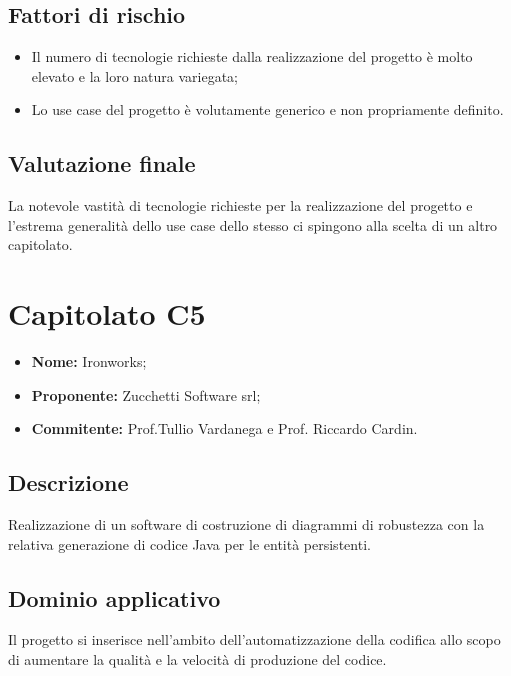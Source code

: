 \documentclass[openany,12pt,a4paper]{report}
\begin{document}
\subsection{Fattori di rischio}

\begin{itemize}
    \item Il numero di tecnologie richieste dalla realizzazione del progetto è molto elevato e la loro natura variegata;
    
    \item Lo use case del progetto è volutamente generico e non propriamente definito.
\end{itemize}

\subsection{Valutazione finale}

La notevole vastità di tecnologie richieste per la realizzazione del progetto e l'estrema generalità dello use case dello stesso ci spingono alla scelta di un altro capitolato.


\section{Capitolato C5}

\begin{itemize}
    \item \textbf{Nome:} Ironworks;
    \item \textbf{Proponente:} Zucchetti Software srl;
    \item \textbf{Commitente:} Prof.Tullio Vardanega e Prof. Riccardo Cardin.
\end{itemize}

\subsection{Descrizione}

Realizzazione di un software di costruzione di diagrammi di robustezza con la relativa generazione di codice Java per le entità persistenti.

\subsection{Dominio applicativo}

Il progetto si inserisce nell'ambito dell'automatizzazione della codifica allo scopo di aumentare la qualità e la velocità di produzione del codice.
\end{document}
